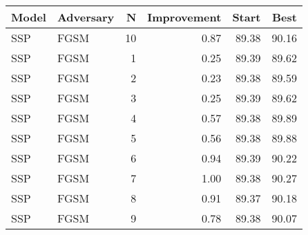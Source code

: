 \begin{tabular}{llrrrr}
\toprule
Model & Adversary &   N &  Improvement &  Start &   Best \\
\midrule
  SSP &      FGSM &  10 &         0.87 &  89.38 &  90.16 \\
  SSP &      FGSM &   1 &         0.25 &  89.39 &  89.62 \\
  SSP &      FGSM &   2 &         0.23 &  89.38 &  89.59 \\
  SSP &      FGSM &   3 &         0.25 &  89.39 &  89.62 \\
  SSP &      FGSM &   4 &         0.57 &  89.38 &  89.89 \\
  SSP &      FGSM &   5 &         0.56 &  89.38 &  89.88 \\
  SSP &      FGSM &   6 &         0.94 &  89.39 &  90.22 \\
  SSP &      FGSM &   7 &         1.00 &  89.38 &  90.27 \\
  SSP &      FGSM &   8 &         0.91 &  89.37 &  90.18 \\
  SSP &      FGSM &   9 &         0.78 &  89.38 &  90.07 \\
\bottomrule
\end{tabular}
